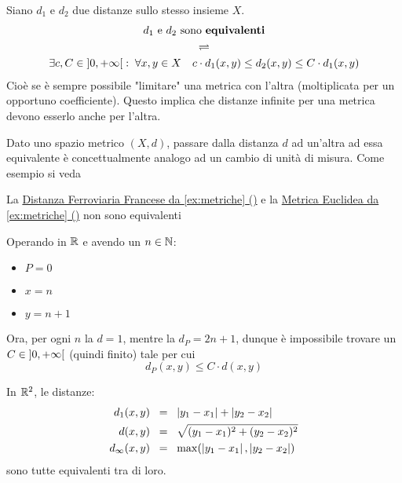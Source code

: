 \begin{definition}
	\label{def:metr_equiv}
	Siano $d_1$ e $d_2$ due distanze sullo stesso insieme $X$.
	\begin{equation*}
		\begin{gathered}
			d_1 \text{ e } d_2 \text{ sono \textbf{equivalenti}}\\
			\rightleftharpoons\\
			\exists c,C \in \left]0,+\infty\right[:\; \forall x,y \in X \quad c \cdot d_1(x,y) \leq d_2 (x,y) \leq C \cdot d_1 (x,y)
		\end{gathered}
	\end{equation*}
	Cioè se è sempre possibile "limitare" una metrica con l'altra (moltiplicata per un opportuno coefficiente). Questo implica che distanze infinite per una metrica devono esserlo anche per l'altra.
	\begin{note}
		Dato uno spazio metrico $(X,d)$, passare dalla distanza $d$ ad un'altra ad essa equivalente è concettualmente analogo ad un cambio di unità di misura. Come esempio si veda 
	\end{note}
\end{definition}
\begin{example}
	La \hyperref[ex:dist_parigi]{Distanza Ferroviaria Francese da \cref*{ex:metriche} ()} e la \hyperref[ex:dist_eucl]{Metrica Euclidea da \cref*{ex:metriche} ()} non sono equivalenti
	\begin{solution}
		Operando in $\mathbb{R}$ e avendo un $n \in \mathbb{N}$:
		\begin{itemize}[noitemsep]
			\item $P = 0$
			\item $x = n$
			\item $y = n+1$
		\end{itemize}
		Ora, per ogni $n$ la $d = 1$, mentre la $d_P = 2n+1$, dunque è impossibile trovare un $C \in \left]0,+\infty\right[$ (quindi finito) tale per cui
		\[d_P(x,y) \leq C \cdot d(x,y)\]
	\end{solution}
\end{example}
\begin{example}
	\label{ex:metr_equiv_R2}
	In $\mathbb{R}^2$, le distanze:
	\begin{align*}
		d_1(x,y) \;\; &= \;\; \left|y_1 - x_1\right| + \left|y_2 - x_2\right|\\
		d(x,y) \;\; &= \;\; \sqrt{(y_1 - x_1)^2 + (y_2 - x_2)^2}\\
		d_\infty(x,y) \;\; &= \;\; \max (\left|y_1 - x_1\right|, \left|y_2 - x_2\right|)
	\end{align*}
	sono tutte equivalenti tra di loro.
\end{example}

